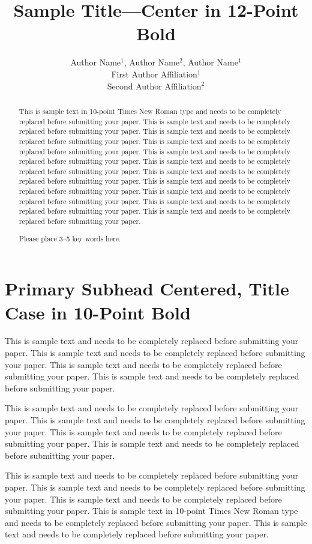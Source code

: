 \documentclass{asaproc}
\title{Sample Title---Center in 12-Point Bold}
\author{Author Name$^1$, Author Name$^2$, Author Name$^1$\\
First Author Affiliation$^1$\\
Second Author Affiliation$^2$}
\begin{document}
\maketitle


\begin{abstract}
This is sample text in 10-point Times New Roman type and needs to be completely replaced before submitting your paper. This is sample text and needs to be completely replaced before submitting your paper. This is sample text and needs to be completely replaced before submitting your paper. This is sample text and needs to be completely replaced before submitting your paper. This is sample text and needs to be completely replaced before submitting your paper. This is sample text and needs to be completely replaced before submitting your paper. This is sample text and needs to be completely replaced before submitting your paper. This is sample text and needs to be completely replaced before submitting your paper. This is sample text and needs to be completely replaced before submitting your paper. This is sample text and needs to be completely replaced before submitting your paper. This is sample text and needs to be completely replaced before submitting your paper.
\begin{keywords}
Please place 3--5 key words here.
\end{keywords}
\end{abstract}


\section{Primary Subhead Centered, Title Case in 10-Point Bold}

This is sample text and needs to be completely replaced before submitting your paper. This is sample text and needs to be completely replaced before submitting your paper. This is sample text and needs to be completely replaced before submitting your paper. This is sample text and needs to be completely replaced before submitting your paper.

This is sample text and needs to be completely replaced before submitting your paper. This is sample text and needs to be completely replaced before submitting your paper.  This is sample text and needs to be completely replaced before submitting your paper. This is sample text and needs to be completely replaced before submitting your paper.

This is sample text and needs to be completely replaced before submitting your paper. This is sample text and needs to be completely replaced before submitting your paper. This is sample text and needs to be completely replaced before submitting your paper. This is sample text in 10-point Times New Roman type and needs to be completely replaced before submitting your paper. This is sample text and needs to be completely replaced before submitting your paper.
\end{document}
